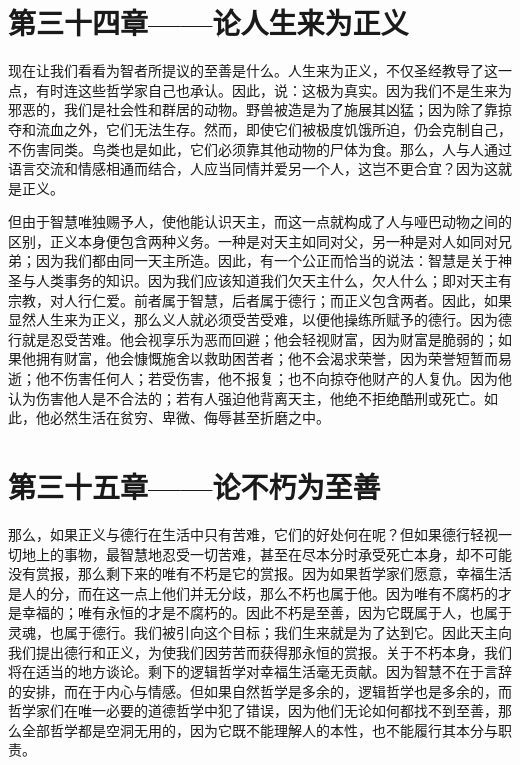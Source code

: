 
\section{第三十四章——论人生来为正义}

现在让我们看看为智者所提议的至善是什么。人生来为正义，不仅圣经教导了这一点，有时连这些哲学家自己也承认。因此，说：这极为真实。因为我们不是生来为邪恶的，我们是社会性和群居的动物。野兽被造是为了施展其凶猛；因为除了靠掠夺和流血之外，它们无法生存。然而，即使它们被极度饥饿所迫，仍会克制自己，不伤害同类。鸟类也是如此，它们必须靠其他动物的尸体为食。那么，人与人通过语言交流和情感相通而结合，人应当同情并爱另一个人，这岂不更合宜？因为这就是正义。\par

但由于智慧唯独赐予人，使他能认识天主，而这一点就构成了人与哑巴动物之间的区别，正义本身便包含两种义务。一种是对天主如同对父，另一种是对人如同对兄弟；因为我们都由同一天主所造。因此，有一个公正而恰当的说法：智慧是关于神圣与人类事务的知识。因为我们应该知道我们欠天主什么，欠人什么；即对天主有宗教，对人行仁爱。前者属于智慧，后者属于德行；而正义包含两者。因此，如果显然人生来为正义，那么义人就必须受苦受难，以便他操练所赋予的德行。因为德行就是忍受苦难。他会视享乐为恶而回避；他会轻视财富，因为财富是脆弱的；如果他拥有财富，他会慷慨施舍以救助困苦者；他不会渴求荣誉，因为荣誉短暂而易逝；他不伤害任何人；若受伤害，他不报复；也不向掠夺他财产的人复仇。因为他认为伤害他人是不合法的；若有人强迫他背离天主，他绝不拒绝酷刑或死亡。如此，他必然生活在贫穷、卑微、侮辱甚至折磨之中。\par


\section{第三十五章——论不朽为至善}

那么，如果正义与德行在生活中只有苦难，它们的好处何在呢？但如果德行轻视一切地上的事物，最智慧地忍受一切苦难，甚至在尽本分时承受死亡本身，却不可能没有赏报，那么剩下来的唯有不朽是它的赏报。因为如果哲学家们愿意，幸福生活是人的分，而在这一点上他们并无分歧，那么不朽也属于他。因为唯有不腐朽的才是幸福的；唯有永恒的才是不腐朽的。因此不朽是至善，因为它既属于人，也属于灵魂，也属于德行。我们被引向这个目标；我们生来就是为了达到它。因此天主向我们提出德行和正义，为使我们因劳苦而获得那永恒的赏报。关于不朽本身，我们将在适当的地方谈论。剩下的逻辑哲学对幸福生活毫无贡献。因为智慧不在于言辞的安排，而在于内心与情感。但如果自然哲学是多余的，逻辑哲学也是多余的，而哲学家们在唯一必要的道德哲学中犯了错误，因为他们无论如何都找不到至善，那么全部哲学都是空洞无用的，因为它既不能理解人的本性，也不能履行其本分与职责。\par

